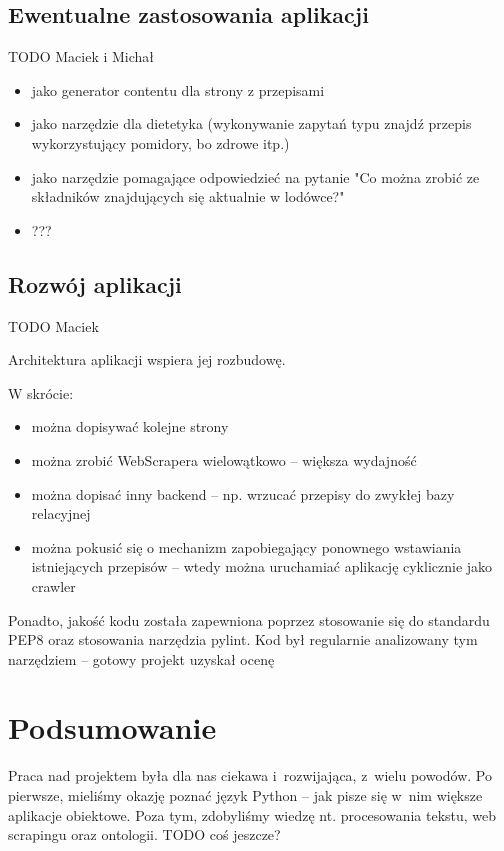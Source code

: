 \documentclass[11pt,a4paper]{article}
\begin{document}
\subsection{Ewentualne zastosowania aplikacji}
TODO Maciek i Michał
\begin{itemize}
  \item jako generator contentu dla strony z przepisami
  \item jako narzędzie dla dietetyka (wykonywanie zapytań typu znajdź przepis wykorzystujący pomidory, bo zdrowe itp.)
  \item jako narzędzie pomagające odpowiedzieć na pytanie "Co można zrobić ze składników znajdujących się aktualnie w lodówce?"
  \item ???
\end{itemize}

\subsection{Rozwój aplikacji}
TODO Maciek

Architektura aplikacji wspiera jej rozbudowę.

W skrócie: %
\begin{itemize}
  \item można dopisywać kolejne strony
  \item można zrobić WebScrapera wielowątkowo -- większa wydajność
  \item można dopisać inny backend -- np. wrzucać przepisy do zwykłej bazy relacyjnej
  \item można pokusić się o mechanizm zapobiegający ponownego wstawiania istniejących przepisów -- wtedy można uruchamiać aplikację cyklicznie jako crawler
\end{itemize}

Ponadto, jakość kodu została zapewniona poprzez stosowanie się do standardu PEP8 oraz stosowania narzędzia pylint. Kod był regularnie analizowany tym narzędziem -- gotowy projekt uzyskał ocenę %

\section{Podsumowanie}
Praca nad projektem była dla nas ciekawa i~rozwijająca, z~wielu powodów. Po pierwsze, mieliśmy okazję poznać język Python -- jak pisze się w~nim większe aplikacje obiektowe. Poza tym, zdobyliśmy wiedzę nt. procesowania tekstu, web scrapingu oraz ontologii. TODO coś jeszcze?

%
\end{document}
